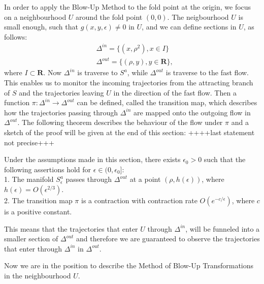 
In order to apply the Blow-Up Method to the fold point at the origin, we focus on a neighbourhood $U$ around the fold point $(0,0)$. 
The neigbourhood $U$ is small enough, such that $g(x,y, \epsilon) \neq 0$ in $U$, and we can define sections in $U$, as follows:
\begin{align*}
&\Delta ^{in} = \{ (x, \rho^2), x \in I \} \\
&\Delta ^{out} = \{ (\rho, y), y \in \mathbf{R} \},
\end{align*}
where $I \subset \mathbf{R}$. Now $\Delta^{in}$ is traverse to $S^a$, while $\Delta^{out}$ is traverse to the fast flow. This enables us to monitor the incoming trajectories from the attracting branch of $S$ and the trajectories leaving $U$ in the direction of the fast flow.
Then a function $\pi : \Delta^{in} \to \Delta^{out}$ can be defined, called the transition map, which describes how the trajectories passing through $\Delta^{in}$ are mapped onto the outgoing flow in $\Delta^{out}$.  
The following theorem describes the behaviour of the flow under $\pi$ and a sketch of the proof will be given at the end of this section: ++++last statement not precise+++

\begin{theorem} \label{transition map theorem}
Under the assumptions made in this section, there exists $ \epsilon_0 >0$ such that the following assertions hold for $\epsilon \in (0, \epsilon_0]$:\\
1. The manifold $S_\epsilon^a$ passes through $\Delta^{out}$ at a point $(\rho, h(\epsilon))$, where $h(\epsilon) = O(\epsilon^{2/3})$.\\
2. The transition map $\pi$ is a contraction with contraction rate $O(e^{-c/\epsilon})$, where $c$ is a positive constant.
\end{theorem}
This means that the trajectories that enter $U$ through $\Delta^{in}$, will be funneled into a smaller section of $\Delta^{out}$ and therefore we are guaranteed to observe the trajectories that enter through $\Delta^{in}$ in $\Delta^{out}$.

Now we are in the position to describe the Method of Blow-Up Transformations in the neighbourhood $U$.

